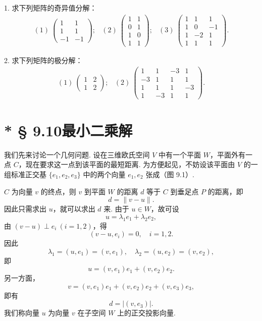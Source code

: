 \documentclass[UTF8, 12pt, fontset=fandol, oneside]{ctexart}
\begin{document}
1. 求下列矩阵的奇异值分解：
\[
\begin{array}{lll}
(1)\ \left(\begin{array}{rr}1 & 1\\ 1 & 1\\ -1 & -1\end{array}\right);
&
(2)\ \left(\begin{array}{rr}1 & 1\\ 0 & 1\\ 1 & 0\\ 1 & 1\end{array}\right);
&
(3)\ \left(\begin{array}{rrr}1 & 1 & 1\\ 1 & 0 & -1\\ 1 & -2 & 1\\ 1 & 1 & 1\end{array}\right).
\end{array}
\]

2. 求下列矩阵的极分解：
\[
\begin{array}{ll}
(1)\ \left(\begin{array}{cc}1 & 2\\ 1 & 2\end{array}\right);
&
(2)\ \left(\begin{array}{rrrr}
1 & 1 & -3 & 1\\
-3 & 1 & 1 & 1\\
1 & 1 & 1 & -3\\
1 & -3 & 1 & 1
\end{array}\right).
\end{array}
\]

\section*{* § 9.10\quad 最小二乘解}

我们先来讨论一个几何问题. 设在三维欧氏空间 $V$ 中有一个平面 $W$，平面外有一点 $C$，现在要求这一点到该平面的最短距离. 为方便起见，不妨设该平面由 $V$ 的一组标准正交基 $\{e_1,e_2,e_3\}$ 中的两个向量 $e_1,e_2$ 张成（图 9.1）.

$C$ 为向量 $v$ 的终点，则 $v$ 到平面 $W$ 的距离 $d$ 等于 $C$ 到垂足点 $P$ 的距离，即
\[
  d=\|v-u\|.
\]
因此只需求出 $u$，就可以求出 $d$ 来. 由于 $u\in W$，故可设
\[
  u=\lambda_1e_1+\lambda_2e_2,
\]
由 $(v-u)\perp e_i\ (i=1,2)$，得
\[
  (v-u,e_i)=0,\quad i=1,2.
\]
因此
\[
  \lambda_1=(u,e_1)=(v,e_1),\quad \lambda_2=(u,e_2)=(v,e_2),
\]
即
\[
  u=(v,e_1)e_1+(v,e_2)e_2.
\]
另一方面，
\[
  v=(v,e_1)e_1+(v,e_2)e_2+(v,e_3)e_3,
\]
即有
\begin{equation}
  d=|(v,e_3)|.
  \tag{9.10.1}
\end{equation}
我们称向量 $u$ 为向量 $v$ 在子空间 $W$ 上的正交投影向量.
\end{document}
